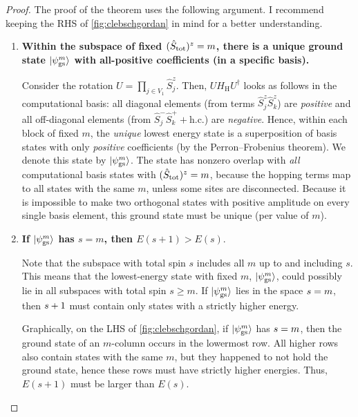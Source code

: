 \begin{proof}
The proof of the theorem uses the following argument. I recommend keeping the RHS of \cref{fig:clebschgordan} in mind for a better understanding.
\begin{enumerate}

\item \textbf{Within the subspace of fixed $({\hat{S}_\text{tot}})^z = m$, there is a unique ground state $\lvert\psi^m_\text{gs}\rangle$ with all-positive coefficients (in a specific basis).} 

Consider the rotation $U = \prod_{j \in V_1} \hat{S}^z_j$. Then, $U H_\text{H} U^\dagger$ looks as follows in the computational basis: all diagonal elements (from terms $\hat{S}^z_j \hat{S}^z_k$) are \emph{positive} and all off-diagonal elements (from $\hat{S}^-_j \hat{S}^+_k + \text{h.c.}$) are \emph{negative}. Hence, within each block of fixed $m$, the \emph{unique} lowest energy state is a superposition of basis states with only \emph{positive} coefficients (by the Perron–Frobenius theorem). We denote this state by $\lvert\psi^m_\text{gs}\rangle$. The state has nonzero overlap with \emph{all} computational basis states with $({\hat{S}_\text{tot}})^z = m$, because the hopping terms map to all states with the same $m$, unless some sites are disconnected. Because it is impossible to make two orthogonal states with positive amplitude on every single basis element, this ground state must be unique (per value of $m$). 


\item \textbf{If $\lvert\psi^m_\text{gs}\rangle$ has $s = m$, then $E(s + 1) > E(s)$}. 

Note that the subspace with total spin $s$ includes all $m$ up to and including $s$. This means that the lowest-energy state with fixed $m$, $\lvert\psi^m_\text{gs}\rangle$, could possibly lie in all subspaces with total spin $s \geq m$. If $\lvert\psi^m_\text{gs}\rangle$ lies in the space ${s} = m$, then ${s}+1$ must contain only states with a strictly higher energy. 

Graphically, on the LHS of \cref{fig:clebschgordan}, if $\lvert\psi^m_\text{gs}\rangle$ has ${s} = m$, then the ground state of an $m$-column occurs in the lowermost row. All higher rows also contain states with the same $m$, but they happened to not hold the ground state, hence these rows must have strictly higher energies. Thus, $E(s+1)$ must be larger than $E(s)$. 



\end{enumerate}
\end{proof}
